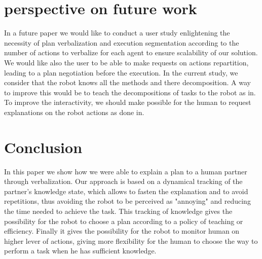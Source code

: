 \documentclass{llncs}
\begin{document}



\section{perspective on future work}

In a future paper we would like to conduct a user study enlightening the necessity of  plan verbalization and execution segmentation according to the number of actions to verbalize for each agent to ensure scalability of our solution.
We would like also the user to be able to make requests on actions repartition, leading to a plan negotiation before the execution.
In the current study, we consider that the robot knows all the methods and there decomposition. A way to improve this would be to teach the decompositions of tasks to the robot as in\cite{Mohseni2015}.
To improve the interactivity, we should make possible for the human to request explanations on the robot actions as done in\cite{Lomas2012}.



\section{Conclusion}
In this paper we show how we were able to explain a plan to a human partner through verbalization.
Our approach is based on a dynamical tracking of the partner's knowledge state, which allows to 
fasten the explanation and to avoid repetitions, thus avoiding the robot to be perceived as "annoying" and reducing the time needed to achieve the task.
This tracking of knowledge gives the possibility for the robot to choose a plan according to a policy of teaching or efficiency. Finally it
gives the possibility for the robot to monitor human on higher lever of actions, giving more flexibility for the human to choose the way to perform a task when he has sufficient knowledge.


%


\end{document}
